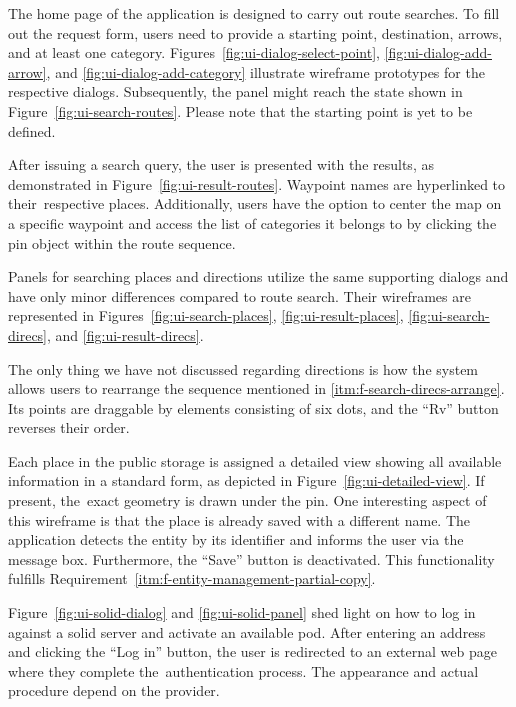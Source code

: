 The home page of the application is designed to carry out route searches. To fill out the request form, users need to provide a starting point, destination, arrows, and at least one category. Figures~\ref{fig:ui-dialog-select-point}, \ref{fig:ui-dialog-add-arrow}, and \ref{fig:ui-dialog-add-category} illustrate wireframe prototypes for the respective dialogs. Subsequently, the panel might reach the state shown in Figure~\ref{fig:ui-search-routes}. Please note that the starting point is yet to be defined.

After issuing a search query, the user is presented with the results, as demonstrated in Figure~\ref{fig:ui-result-routes}. Waypoint names are hyperlinked to their~re\-spec\-tive places. Additionally, users have the option to center the map on a specific waypoint and access the list of categories it belongs to by clicking the pin object within the route sequence.

Panels for searching places and directions utilize the same supporting dialogs and have only minor differences compared to route search. Their wireframes are rep\-re\-sent\-ed in Figures~\ref{fig:ui-search-places}, \ref{fig:ui-result-places}, \ref{fig:ui-search-direcs}, and \ref{fig:ui-result-direcs}.

The only thing we have not discussed regarding directions is how the system allows users to rearrange the sequence mentioned in \ref{itm:f-search-direcs-arrange}. Its points are draggable by elements consisting of six dots, and the ``Rv'' button reverses their order.

Each place in the public storage is assigned a detailed view showing all available information in a standard form, as depicted in Figure~\ref{fig:ui-detailed-view}. If present, the~exact geometry is drawn under the pin. One interesting aspect of this wireframe is that the place is already saved with a different name. The application detects the entity by its identifier and informs the user via the message box. Furthermore, the ``Save'' button is deactivated. This functionality fulfills Requirement~\ref{itm:f-entity-management-partial-copy}.

Figure~\ref{fig:ui-solid-dialog} and \ref{fig:ui-solid-panel} shed light on how to log in against a \acs{solid} server and activate an available pod. After entering an address and clicking the ``Log in'' button, the user is redirected to an external web page where they complete the~au\-then\-ti\-ca\-tion process. The appearance and actual procedure depend on the provider.


